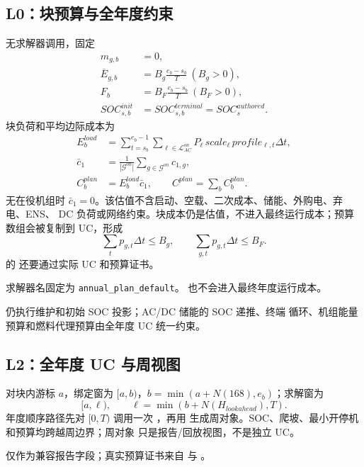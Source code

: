 \subsection{L0：块预算与全年度约束}
 无求解器调用，固定
\begin{align}
 m_{g,b}&=0,\\
 \overline E_{g,b}&=B_g\frac{e_b-s_b}{T}\ (B_g>0),\\
 F_b&=B_F\frac{e_b-s_b}{T}\ (B_F>0),\\
 SOC^{init}_{s,b}&=SOC^{terminal}_{s,b}=SOC^{authored}_s.
\end{align}
块负荷和平均边际成本为
\begin{align}
 E^{load}_b&=\sum_{t=s_b}^{e_b-1}\sum_{\ell\in\mathcal L_{AC}^{on}}
 P_\ell\,scale_\ell\,profile_{\ell,t}\Delta t,\\
 \bar c_1&=\frac{1}{|\mathcal G^{on}|}\sum_{g\in\mathcal G^{on}}c_{1,g},\\
 C_b^{plan}&=E_b^{load}\bar c_1,
 \qquad C^{plan}=\sum_b C_b^{plan}.
\end{align}
无在役机组时 $\bar c_1=0$。该估值不含启动、空载、二次成本、储能、外购电、弃电、ENS、
DC 负荷或网络约束。块成本仍是估值，不进入最终运行成本；预算数组会被复制到 UC，形成
\begin{equation}
 \sum_t p_{g,t}\Delta t\le B_g,\qquad
 \sum_{g,t}p_{g,t}\Delta t\le B_F .
\end{equation}
 的  还要通过实际 UC 和预算证书。
\par 求解器名固定为 \texttt{annual\_plan\_default}。
 也不会进入最终年度运行成本。

 仍执行维护和初始 SOC 投影；AC/DC 储能的 SOC 递推、终端
循环、机组能量预算和燃料代理预算由全年度 UC 统一约束。

\subsection{L2：全年度 UC 与周视图}
对块内游标 $a$，绑定窗为 $[a,b)$，$b=\min(a+N(168),e_b)$；求解窗为
\begin{equation}
 [a,\ell),\qquad \ell=\min(b+N(H_{lookahead}),T).
\end{equation}
年度顺序路径先对 $[0,T)$ 调用一次 ，再用
 生成周对象。SOC、爬坡、最小开停机和预算均跨越周边界；周对象
只是报告/回放视图，不是独立 UC。

 仅作为兼容报告字段；真实预算证书来自
 与 。

